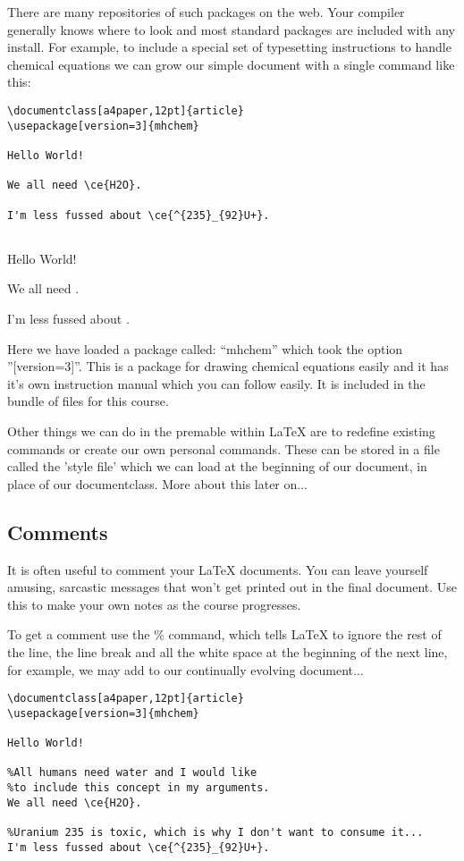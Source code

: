 There are many repositories of such packages on the web. Your compiler generally knows where to look and most standard packages are included with any install. For example, to include a special set of typesetting instructions to handle chemical equations we can grow our simple document with a single command like this:

\begin{verbatim}
\documentclass[a4paper,12pt]{article}
\usepackage[version=3]{mhchem}

Hello World!

We all need \ce{H2O}.

I'm less fussed about \ce{^{235}_{92}U+}.


\end{verbatim}

\vspace{2ex}

\pagebreak
\thispagestyle{empty}
Hello World!

We all need .

I'm less fussed about .
\pagebreak

Here we have loaded a package called: "`mhchem"' which took the option ''[version=3]''. This is a package for drawing chemical equations easily and it has it's own instruction manual which you can follow easily. It is included in the bundle of files for this course.

Other things we can do in the premable within LaTeX are to redefine existing commands or create our own personal commands. These can be stored in a file called the 'style file' which we can load at the beginning of our document, in place of our documentclass. More about this later on...


\subsection{Comments}
It is often useful to comment your LaTeX documents. You can leave yourself amusing, sarcastic messages that won't get printed out in the final document. Use this to make your own notes as the course progresses.

To get a comment use the \% command, which tells LaTeX to ignore the rest of the line, the line break and all the white space at the beginning of the next line, for example, we may add to our continually evolving document...

\begin{verbatim}
\documentclass[a4paper,12pt]{article}
\usepackage[version=3]{mhchem}

Hello World!

%All humans need water and I would like 
%to include this concept in my arguments.
We all need \ce{H2O}.

%Uranium 235 is toxic, which is why I don't want to consume it... 
I'm less fussed about \ce{^{235}_{92}U+}.


\end{verbatim}

